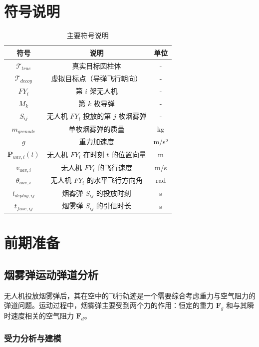 \documentclass[fontset=SimSun]{ctexart}
\begin{document}
\section{符号说明}

\begin{table}[H]
\centering
\caption{主要符号说明}
\begin{tabularx}{0.9\textwidth}{c C c}
\toprule
\textbf{符号} & \textbf{说明} & \textbf{单位} \\
\midrule
$\mathcal{T}_{true}$ & 真实目标圆柱体 & - \\
$\mathcal{T}_{decoy}$ & 虚拟目标点（导弹飞行朝向） & - \\
$FY_i$ & 第 $i$ 架无人机 & - \\
$M_k$ & 第 $k$ 枚导弹 & - \\
$S_{ij}$ & 无人机 $FY_i$ 投放的第 $j$ 枚烟雾弹 & - \\
$m_{grenade}$ & 单枚烟雾弹的质量 & kg \\
$g$ & 重力加速度 & m/s² \\
$\mathbf{P}_{uav, i}(t)$ & 无人机 $FY_i$ 在时刻 $t$ 的位置向量 & m \\
$v_{uav, i}$ & 无人机 $FY_i$ 的飞行速度 & m/s \\
$\theta_{uav, i}$ & 无人机 $FY_i$ 的水平飞行方向角 & rad \\
$t_{deploy, ij}$ & 烟雾弹 $S_{ij}$ 的投放时刻 & s \\
$t_{fuse, ij}$ & 烟雾弹 $S_{ij}$ 的引信时长 & s \\
\bottomrule
\end{tabularx}
\end{table}
\section{前期准备}

\subsection{烟雾弹运动弹道分析}

无人机投放烟雾弹后，其在空中的飞行轨迹是一个需要综合考虑重力与空气阻力的弹道问题。运动过程中，烟雾弹主要受到两个力的作用：恒定的重力 $ \mathbf{F}_g $ 和与其瞬时速度相关的空气阻力 $ \mathbf{F}_d $。

\subsubsection{受力分析与建模}
\end{document}
